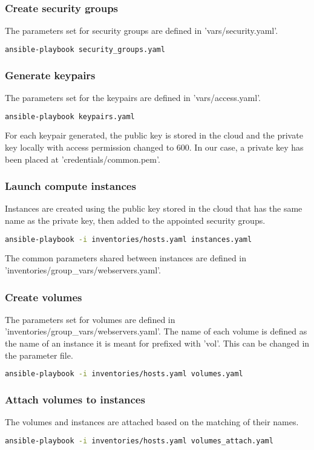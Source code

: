\subsubsection{Create security groups}
The parameters set for security groups are defined in 'vars/security.yaml'.  
\begin{lstlisting}[language=bash]
ansible-playbook security_groups.yaml
\end{lstlisting}

\subsubsection{Generate keypairs}
The parameters set for the keypairs are defined in 'vars/access.yaml'.  
\begin{lstlisting}[language=bash]
ansible-playbook keypairs.yaml
\end{lstlisting}
For each keypair generated, the public key is stored in the cloud and the private key locally with access permission changed to 600. In our case, a private key has been placed at 'credentials/common.pem'.  

\subsubsection{Launch compute instances}
Instances are created using the public key stored in the cloud that has the same name as the private key, then added to the appointed security groups.  
\begin{lstlisting}[language=bash]
ansible-playbook -i inventories/hosts.yaml instances.yaml
\end{lstlisting}

The common parameters shared between instances are defined in 'inventories/group\_vars/webservers.yaml'.  

\subsubsection{Create volumes}
The parameters set for volumes are defined in 'inventories/group\_vars/webservers.yaml'. The name of each volume is defined as the name of an instance it is meant for prefixed with 'vol'. This can be changed in the parameter file.  
\begin{lstlisting}[language=bash]
ansible-playbook -i inventories/hosts.yaml volumes.yaml
\end{lstlisting}

\subsubsection{Attach volumes to instances}
The volumes and instances are attached based on the matching of their names.  
\begin{lstlisting}[language=bash]
ansible-playbook -i inventories/hosts.yaml volumes_attach.yaml
\end{lstlisting}

